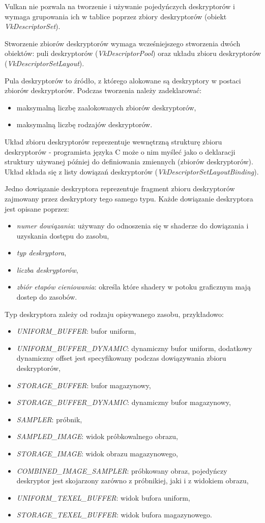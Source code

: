 Vulkan nie pozwala na tworzenie i używanie pojedyńczych deskryptorów i wymaga grupowania ich w tablice poprzez zbiory deskryptorów  (obiekt \textit{VkDescriptorSet}).

Stworzenie zbiorów deskryptorów wymaga wcześniejszego stworzenia dwóch obiektów: puli deskryptorów (\textit{VkDescriptorPool})
oraz układu zbioru deskryptorów (\textit{VkDescriptorSetLayout}).

Pula deskryptorów to źródło, z którego alokowane są deskryptory w postaci zbiorów deskryptorów. Podczas tworzenia należy zadeklarować:
\begin{itemize}
	\item maksymalną liczbę zaalokowanych zbiorów deskryptorów,
	\item maksymalną liczbę rodzajów deskryptorów.
\end{itemize}

Układ zbioru deskryptorów reprezentuje wewnętrzną strukturę zbioru deskryptorów - programista języka C może o nim myśleć jako o deklaracji struktury używanej później do definiowania zmiennych (zbiorów deskryptorów).
Układ składa się z listy dowiązań deskryptorów (\textit{VkDescriptorSetLayoutBinding}).

Jedno dowiązanie deskryptora reprezentuje fragment zbioru deskryptorów zajmowany przez deskryptory tego samego typu.
Każde dowiązanie deskryptora jest opisane poprzez:
\begin{itemize}
	\item {\textit{numer dowiązania}}: używany do odnoszenia się w shaderze do dowiązania i uzyskania dostępu do
	zasobu,
	\item \textit{typ deskryptora},
	\item \textit{liczba deskryptorów},
	\item {\textit{zbiór etapów cieniowania}}: określa które shadery w potoku graficznym mają dostep do zasobów.
\end{itemize}
Typ deskryptora zależy od rodzaju opisywanego zasobu, przykładowo:
\begin{itemize}
	\item {\textit{UNIFORM\_BUFFER}}: bufor uniform,
	\item {\textit{UNIFORM\_BUFFER\_DYNAMIC}}: dynamiczny bufor uniform, dodatkowy dynamiczny offset jest specyfikowany podczas dowiązywania zbioru deskryptorów,
	\item {\textit{STORAGE\_BUFFER}}: bufor magazynowy,
	\item {\textit{STORAGE\_BUFFER\_DYNAMIC}}: dynamiczny bufor magazynowy,
	\item {\textit{SAMPLER}}: próbnik,
	\item {\textit{SAMPLED\_IMAGE}}: widok próbkowalnego obrazu,
	\item {\textit{STORAGE\_IMAGE}}: widok obrazu magazynowego,
	\item {\textit{COMBINED\_IMAGE\_SAMPLER}}: próbkowany obraz, pojedyńczy deskryptor jest skojarzony zarówno z próbnikiej, jaki i z widokiem obrazu,
	\item {\textit{UNIFORM\_TEXEL\_BUFFER}}: widok bufora uniform,
	\item {\textit{STORAGE\_TEXEL\_BUFFER}}: widok bufora magazynowego.
\end{itemize}


